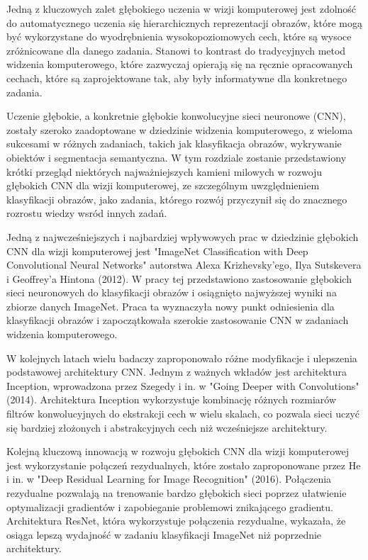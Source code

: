 Jedną z kluczowych zalet głębokiego uczenia w wizji komputerowej jest zdolność do automatycznego uczenia się hierarchicznych reprezentacji obrazów, które mogą być wykorzystane do wyodrębnienia wysokopoziomowych cech, które są wysoce zróżnicowane dla danego zadania. Stanowi to kontrast do tradycyjnych metod widzenia komputerowego, które zazwyczaj opierają się na ręcznie opracowanych cechach, które są zaprojektowane tak, aby były informatywne dla konkretnego zadania.

Uczenie głębokie, a konkretnie głębokie konwolucyjne sieci neuronowe (CNN), zostały szeroko zaadoptowane w dziedzinie widzenia komputerowego, z wieloma sukcesami w różnych zadaniach, takich jak klasyfikacja obrazów, wykrywanie obiektów i segmentacja semantyczna. W tym rozdziale zostanie przedstawiony krótki przegląd niektórych najważniejszych kamieni milowych w rozwoju głębokich CNN dla wizji komputerowej, ze szczególnym uwzględnieniem klasyfikacji obrazów, jako zadania, którego rozwój przyczynił się do znacznego rozrostu wiedzy wsród innych zadań.

Jedną z najwcześniejszych i najbardziej wpływowych prac w dziedzinie głębokich CNN dla wizji komputerowej jest "ImageNet Classification with Deep Convolutional Neural Networks" autorstwa Alexa Krizhevsky'ego, Ilya Sutskevera i Geoffrey'a Hintona (2012). W pracy tej przedstawiono zastosowanie głębokich sieci neuronowych do klasyfikacji obrazów i osiągnięto najwyższej wyniki na zbiorze danych ImageNet. Praca ta wyznaczyła nowy punkt odniesienia dla klasyfikacji obrazów i zapoczątkowała szerokie zastosowanie CNN w zadaniach widzenia komputerowego.

W kolejnych latach wielu badaczy zaproponowało różne modyfikacje i ulepszenia podstawowej architektury CNN. Jednym z ważnych wkładów jest architektura Inception, wprowadzona przez Szegedy i in. w "Going Deeper with Convolutions" (2014). Architektura Inception wykorzystuje kombinację różnych rozmiarów filtrów konwolucyjnych do ekstrakcji cech w wielu skalach, co pozwala sieci uczyć się bardziej złożonych i abstrakcyjnych cech niż wcześniejsze architektury.

Kolejną kluczową innowacją w rozwoju głębokich CNN dla wizji komputerowej jest wykorzystanie połączeń rezydualnych, które zostało zaproponowane przez He i in. w "Deep Residual Learning for Image Recognition" (2016). Połączenia rezydualne pozwalają na trenowanie bardzo głębokich sieci poprzez ułatwienie optymalizacji gradientów i zapobieganie problemowi znikającego gradientu. Architektura ResNet, która wykorzystuje połączenia rezydualne, wykazała, że osiąga lepszą wydajność w zadaniu klasyfikacji ImageNet niż poprzednie architektury.

